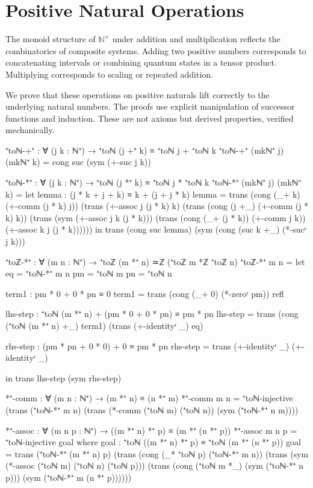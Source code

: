 \documentclass[11pt,a4paper]{book}
\begin{document}
\section{Positive Natural Operations}

The monoid structure of $\mathbb{N}^+$ under addition and multiplication reflects the combinatorics of composite systems.
Adding two positive numbers corresponds to concatenating intervals or combining quantum states in a tensor product.
Multiplying corresponds to scaling or repeated addition.

We prove that these operations on positive naturals lift correctly to the underlying natural numbers.
The proofs use explicit manipulation of successor functions and induction.
These are not axioms but derived properties, verified mechanically.

\begin{code}
⁺toℕ-+⁺ : ∀ (j k : ℕ⁺) → ⁺toℕ (j +⁺ k) ≡ ⁺toℕ j + ⁺toℕ k
⁺toℕ-+⁺ (mkℕ⁺ j) (mkℕ⁺ k) = cong suc (sym (+-suc j k))

⁺toℕ-*⁺ : ∀ (j k : ℕ⁺) → ⁺toℕ (j *⁺ k) ≡ ⁺toℕ j * ⁺toℕ k
⁺toℕ-*⁺ (mkℕ⁺ j) (mkℕ⁺ k) = 
  let
    lemma : (j * k + j + k) ≡ k + (j + j * k)
    lemma = trans (cong (_+ k) (+-comm (j * k) j))
            (trans (+-assoc j (j * k) k)
            (trans (cong (j +_) (+-comm (j * k) k))
            (trans (sym (+-assoc j k (j * k)))
            (trans (cong (_+ (j * k)) (+-comm j k))
            (+-assoc k j (j * k))))))
  in trans (cong suc lemma) (sym (cong (suc k +_) (*-sucʳ j k)))

⁺toℤ-*⁺ : ∀ (m n : ℕ⁺) → ⁺toℤ (m *⁺ n) ≃ℤ (⁺toℤ m *ℤ ⁺toℤ n)
⁺toℤ-*⁺ m n = 
  let eq = ⁺toℕ-*⁺ m n
      pm = ⁺toℕ m
      pn = ⁺toℕ n
      
      term1 : pm * 0 + 0 * pn ≡ 0
      term1 = trans (cong (_+ 0) (*-zeroʳ pm)) refl
      
      lhs-step : ⁺toℕ (m *⁺ n) + (pm * 0 + 0 * pn) ≡ pm * pn
      lhs-step = trans (cong (⁺toℕ (m *⁺ n) +_) term1) 
                       (trans (+-identityʳ _) eq)
                       
      rhs-step : (pm * pn + 0 * 0) + 0 ≡ pm * pn
      rhs-step = trans (+-identityʳ _) (+-identityʳ _)
      
  in trans lhs-step (sym rhs-step)


*⁺-comm : ∀ (m n : ℕ⁺) → (m *⁺ n) ≡ (n *⁺ m)
*⁺-comm m n = ⁺toℕ-injective (trans (⁺toℕ-*⁺ m n) (trans (*-comm (⁺toℕ m) (⁺toℕ n)) (sym (⁺toℕ-*⁺ n m))))

*⁺-assoc : ∀ (m n p : ℕ⁺) → ((m *⁺ n) *⁺ p) ≡ (m *⁺ (n *⁺ p))
*⁺-assoc m n p = ⁺toℕ-injective goal
  where
    goal : ⁺toℕ ((m *⁺ n) *⁺ p) ≡ ⁺toℕ (m *⁺ (n *⁺ p))
    goal = trans (⁺toℕ-*⁺ (m *⁺ n) p)
           (trans (cong (_* ⁺toℕ p) (⁺toℕ-*⁺ m n))
           (trans (sym (*-assoc (⁺toℕ m) (⁺toℕ n) (⁺toℕ p)))
           (trans (cong (⁺toℕ m *_) (sym (⁺toℕ-*⁺ n p)))
                  (sym (⁺toℕ-*⁺ m (n *⁺ p))))))
\end{code}
\end{document}

